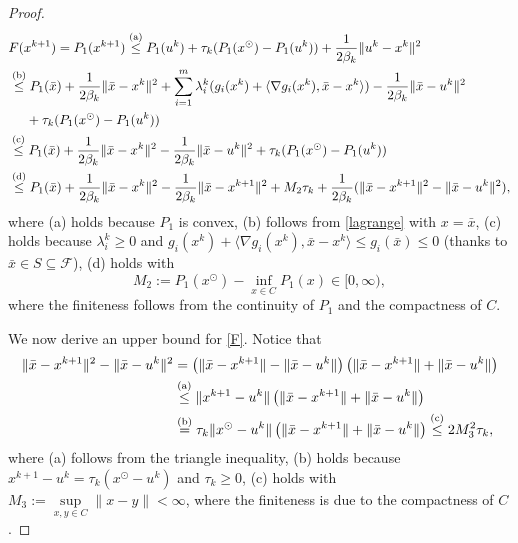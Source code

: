 \documentclass[10pt]{article}
\numberwithin{equation}{section}
\def\xfeas{x^\odot}
\begin{document}
\begin{proof}
\begin{align}\label{F}
&F(x^{k+1})= P_1(x^{k+1})\overset{\rm (a)}\leq P_1(u^k) + \tau_k(P_1(\xfeas) - P_1(u^k)) + \frac{1}{2\beta_k}\|u^k - x^k\|^2 \nonumber\\
&\overset{\rm (b)}\leq P_1(\bar{x}) + \frac{1}{2\beta_k}\|\bar{x} - x^k\|^2 + \sum_{i=1}^m\lambda^k_i(g_i(x^k) + \langle \nabla g_i(x^k), \bar{x} - x^k\rangle)- \frac{1}{2\beta_k}\|\bar{x} - u^k\|^2 \nonumber\\
 &~~~~+ \tau_k(P_1(\xfeas) - P_1(u^k))\nonumber\\
 &\overset{\rm (c)}\leq P_1(\bar{x}) + \frac{1}{2\beta_k}\|\bar{x} - x^k\|^2 - \frac{1}{2\beta_k}\|\bar{x} - u^k\|^2 + \tau_k(P_1(\xfeas) - P_1(u^k))\nonumber\\
 &\overset{\rm (d)}\leq P_1(\bar{x}) + \frac{1}{2\beta_k}\|\bar{x} - x^k\|^2 - \frac{1}{2\beta_k}\|\bar{x} - x^{k+1}\|^2 + M_2\tau_k + \frac{1}{2\beta_k}(\|\bar{x} - x^{k+1}\|^2 - \|\bar{x} - u^k\|^2),
 \end{align}
where (a) holds because $P_1$ is convex, (b) follows from \eqref{lagrange} with $x = \bar x$, (c) holds because $\lambda^k_i\geq 0$ and $g_i(x^k) + \langle \nabla g_i(x^k), \bar{x} - x^k\rangle \leq g_i(\bar{x}) \leq 0$ (thanks to $\bar{x}\in S \subseteq\mathcal{F}$), (d) holds with $$M_2:= P_1(\xfeas)- \inf\limits_{x\in C}P_1(x) \in [0,\infty),$$ where the finiteness follows from the continuity of $P_1$ and the compactness of $C$.

We now derive an upper bound for \eqref{F}. Notice that
\begin{align}\label{normsqu}
\|\bar{x} - x^{k+1}\|^2 - \|\bar{x} - u^k\|^2& =\left(\|\bar{x} - x^{k+1}\| - \|\bar{x} - u^k\|\right)\left(\|\bar{x} - x^{k+1}\| + \|\bar{x} - u^k\|\right) \nonumber\\
&\overset{\rm (a)}\leq \|x^{k+1} - u^k\|\left(\|\bar{x} - x^{k+1}\| + \|\bar{x} - u^k\|\right)\nonumber\\
&\overset{\rm (b)}= \tau_k\|\xfeas - u^k\|\left(\|\bar{x} - x^{k+1}\| + \|\bar{x} - u^k\|\right)\overset{\rm (c)}\leq 2M_3^2 \tau_k,
\end{align}
where (a) follows from the triangle inequality, (b) holds because $x^{k+1} - u^k = \tau_k(\xfeas - u^k)$ and $\tau_k \geq 0$, (c) holds with $M_3:= \sup\limits_{x,y\in C}\|x - y\| < \infty$, where the finiteness is due to the compactness of $C$.


\end{proof}
\end{document}
